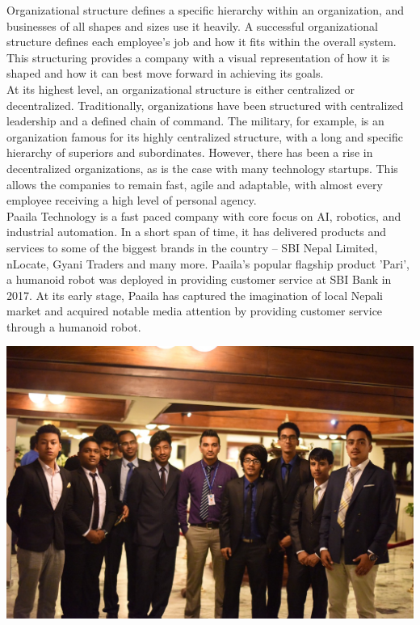 \documentclass[12pt,a4paper]{scrreprt}
\begin{document}
Organizational structure defines a specific hierarchy within an organization, and businesses of all shapes and sizes use it heavily. A successful organizational structure defines each employee's job and how it fits within the overall system. This structuring provides a company with a visual representation of how it is shaped and how it can best move forward in achieving its goals. \\

At its highest level, an organizational structure is either centralized or decentralized. Traditionally, organizations have been structured with centralized leadership and a defined chain of command. The military, for example, is an organization famous for its highly centralized structure, with a long and specific hierarchy of superiors and subordinates. However, there has been a rise in decentralized organizations, as is the case with many technology startups. This allows the companies to remain fast, agile and adaptable, with almost every employee receiving a high level of personal agency. \\

Paaila Technology is a fast paced company with core focus on AI, robotics, and industrial automation. In a short span of time, it has delivered products and services to some of the biggest brands in the country – SBI Nepal Limited, nLocate, Gyani Traders and many more. Paaila's popular flagship product 'Pari', a humanoid robot was deployed in providing customer service at SBI Bank in 2017. At its early stage, Paaila has captured the imagination of local Nepali market and acquired notable media attention by providing customer service through a humanoid robot. \\

\begin{center}
    \includegraphics[scale=0.45]{paila-group}
\end{center}
\end{document}
